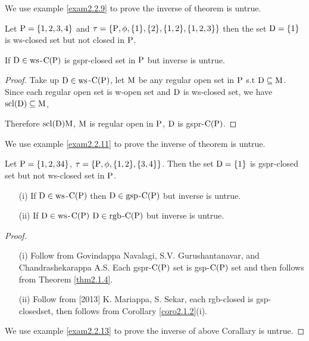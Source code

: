 We use example \ref{exam2.2.9} to prove the inverse of theorem is untrue. 

\begin{exm}\label{exam2.2.9}
Let $\mathrm{P}= \{1, 2, 3, 4\}$ and  $\tau= \{\mathrm{P}, \phi, \{1\}, \{2\}, \{1, 2\}, \{1, 2, 3\}\}$ then the set $\mathrm{D} = \{1\}$ is ws-closed set but not closed in $\mathrm{P}$.
\end{exm}

\begin{thm}\label{thm2.2.10}
If $\mathrm{D}\in \mathrm{ws}$-$\mathrm{C}(\mathrm{P})$ is gspr-closed set in $\mathrm{P}$ but inverse is untrue.
\end{thm}

\begin{proof}
Take up $\mathrm{D}\in\mathrm{ws}$-$\mathrm{C}(\mathrm{P})$, let $\mathrm{M}$ be any regular open set in $\mathrm{P}$ s.t $\mathrm{D} \subseteq \mathrm{M}$. Since each regular open set is w-open set and $\mathrm{D}$ is ws-closed set, we have $\mathrm{scl}(\mathrm{D})\subseteq \mathrm{M}$,

Therefore $\mathrm{scl}(\mathrm{D})\mathrm{M}$, $\mathrm{M}$ is regular open in $\mathrm{P}$, $\mathrm{D}$ is gspr-$\mathrm{C}(\mathrm{P})$.
\end{proof}

We use example \ref{exam2.2.11} to prove the inverse of theorem is untrue.

\begin{exm}\label{exam2.2.11}
Let $\mathrm{P} = \{1, 2, 3 4\}$, $\tau = \{\mathrm{P},\phi,\{1, 2\}, \{3, 4\}\}$. Then the set $\mathrm{D}= \{1\}$ is gspr-closed set but not ws-closed set in $\mathrm{P}$.
\end{exm}

\begin{coro}\label{coro2.2.12}
\begin{itemize}
\item[(i)] If $\mathrm{D}\in \mathrm{ws}$-$\mathrm{C}(\mathrm{P})$ then $\mathrm{D}\in \mathrm{gsp}$-$\mathrm{C}(\mathrm{P})$ but inverse is untrue.
\item[(ii)] If $\mathrm{D}\in \mathrm{ws}$-$\mathrm{C}(\mathrm{P})$ $\mathrm{D}\in \mathrm{rgb}$-$\mathrm{C}(\mathrm{P})$ but inverse is untrue.
\end{itemize}
\end{coro}

\begin{proof}
\begin{itemize}
\item[(i)] Follow from \cite{Navalagi2} Govindappa Navalagi, S.V. Gurushantanavar, and Chandrashekarappa A.S. Each gspr-$\mathrm{C}(\mathrm{P})$ set is gsp-$\mathrm{C}(\mathrm{P})$ set and then follows from Theorem \ref{thm2.1.4}.

\item[(ii)] Follow from [2013] K. Mariappa, S. Sekar, \cite{Mariappa} each rgb-closed is gsp-closedset, then follows from Corollary \ref{coro2.1.2}(i).
\end{itemize}
We use example \ref{exam2.2.13} to prove the inverse of above Corallary is untrue.
\end{proof}

